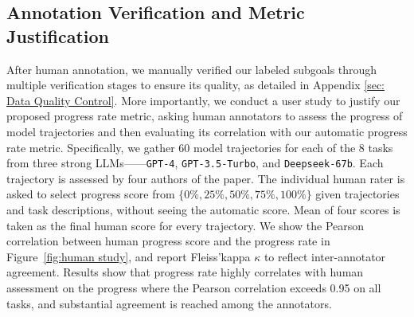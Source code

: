 \subsection{Annotation Verification and Metric Justification\label{sec: annotation verification}}


After human annotation, we manually verified our labeled subgoals through multiple verification stages to ensure its quality, as detailed in Appendix \ref{sec: Data Quality Control}. 
More importantly, we conduct a user study to justify our proposed progress rate metric, 
asking human annotators to assess the progress of model trajectories and then evaluating its correlation with our automatic progress rate metric. 
Specifically, we gather 60 model trajectories for each of the 8 tasks from three strong LLMs——\texttt{GPT-4}, \texttt{GPT-3.5-Turbo}, and \texttt{Deepseek-67b}. Each trajectory is assessed by four authors of the paper. The individual human rater is asked to select progress score from $\{0\%, 25\%, 50\%, 75\%, 100\%\}$ given trajectories and task descriptions, without seeing the automatic score.   
Mean of four scores is taken as the final human score for every trajectory. 
We show the Pearson correlation between human progress score and the progress rate in Figure~\ref{fig:human study}, and report Fleiss'kappa $\kappa$ to reflect inter-annotator agreement. 
Results show that progress rate highly correlates with human assessment on the progress where the Pearson correlation exceeds 0.95 on all tasks, 
and substantial agreement is reached among the annotators.




